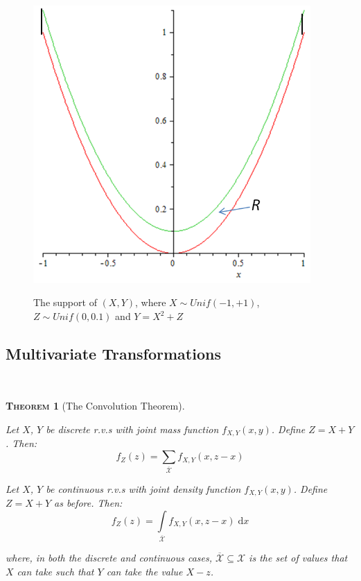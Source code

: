 \documentclass[12pt,a4paper]{article}
\newtheorem{theorem}{\textsc{Theorem}}[section]
\newcommand{\diff}{\mathrm{d}}
\begin{document}
\begin{figure}[h]
\begin{center}
\includegraphics[height=10.58cm,width=10.58cm]{M2S1 Uncorrelated but Dependent.png}\label{figure uncorrelated, dependent}
\caption{The support of $(X,Y)$, where $X \sim Unif(-1,+1)$, $Z \sim Unif(0,0.1)$ and $Y = X^2 + Z$}
\end{center}
\end{figure}

\subsection{Multivariate Transformations}$\;$

\begin{theorem}[The Convolution Theorem]$\quad$\par\vspace{1cm}

 Let $X$, $Y$ be discrete r.v.s with joint mass function $f_{X,Y}(x,y)$. Define $Z=X+Y$. Then:
$$f_Z(z) = \sum\limits_{\overline{\mathcal{X}}} f_{X,Y}(x,z-x)$$

 Let $X$, $Y$ be continuous r.v.s with joint density function $f_{X,Y}(x,y)$. Define $Z=X+Y$ as before. Then:
$$f_Z(z) = \int\limits_{\overline{\mathcal{X}}}\!\! f_{X,Y}(x,z-x)\;\diff x$$

\noindent where, in both the discrete and continuous cases, $\overline{\mathcal{X}}\subseteq\mathcal{X}$ is the set of values that $X$ can take such that $Y$ can take the value $X-z$.

\end{theorem}
\end{document}
